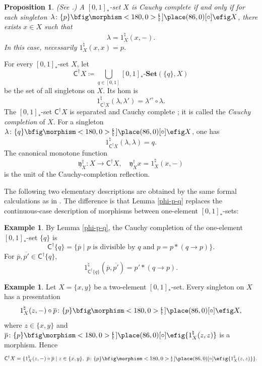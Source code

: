 \documentclass{birkau}
\theoremstyle{plain}
\newtheorem{prop}[thm]{Proposition}
\theoremstyle{definition}
\newtheorem{exmp}[thm]{Example}
\def\oto{{\bfig\morphism<180,0>[\mkern-4mu`\mkern-4mu;]\place(86,0)[\circ]\efig}}
\newcommand{\ra}{\rightarrow}
\newcommand{\nat}{\natural}
\newcommand{\lam}{\lambda}
\newcommand{\sC}{\mathsf{C}}
\newcommand{\Fy}{\mathfrak{y}}
\newcommand{\Set}{\mathbf{Set}}
\newcommand{\RSet}{[0,1]_*\text{-}\Set}
\newcommand{\sCd}{\sC^{\dag}}
\newcommand{\Fyd}{\Fy^{\dag}}
\newcommand{\CdX}{\sCd X}
\numberwithin{equation}{section}
\begin{document}
\begin{prop} \label{Cauchy-complete-def} (See \cite[Proposition 7.1]{Stubbe2005}.)
A $[0,1]_*$-set $X$ is Cauchy complete if and only if for each singleton $\lam\colon\{p\}\oto X$, there exists $x\in X$ such that
\[\lam=1_X^{\nat}(x,-).\]
In this case, necessarily $1_X^{\nat}(x,x)=p$.
\end{prop}

For every $[0,1]_*$-set $X$, let
\[\CdX\coloneqq\bigcup_{q\in[0,1]}\RSet(\{q\},X)\]
be the set of all singletons on $X$. Its hom is
\begin{equation} \label{CdX-hom}
1_{\CdX}^{\nat}(\lam,\lam')={\lam'}^{\circ}\circ\lam.
\end{equation}
The $[0,1]_*$-set $\CdX$ is separated and Cauchy complete \cite[Proposition 7.12]{Stubbe2005}; it is called the \emph{Cauchy completion} of $X$. For a singleton $\lam\colon\{q\}\oto X$, one has
\begin{equation} \label{CdX-type}
1_{\CdX}^{\nat}(\lam,\lam)=q.
\end{equation}
The canonical monotone function
\begin{equation} \label{FYd-def}
\Fyd_X\colon X\to\CdX,\quad \Fyd_X x=1_X^{\nat}(x,-)
\end{equation}
is the unit of the Cauchy-completion reflection.

The following two elementary descriptions are obtained by the same formal calculations as in \cite[Examples 3.3 and 3.4]{Shen2026}. The difference is that Lemma \ref{phi-p-q} replaces the continuous-case description of morphisms between one-element $[0,1]_*$-sets:

\begin{exmp} \label{Cdq-exmp}
By Lemma \ref{phi-p-q}, the Cauchy completion of the one-element $[0,1]_*$-set $\{q\}$ is
\begin{equation} \label{Cdq}
\sCd\{q\}=\{\overline{p}\mid p\text{ is divisible by }q\text{ and }p=p*(q\ra p)\}.
\end{equation}
For $\overline{p},\overline{p'}\in\sCd\{q\}$,
\begin{equation} \label{Cdp-hom}
1_{\sCd\{q\}}^{\nat}(\overline{p},\overline{p'})=p'*(q\ra p).
\end{equation}
\end{exmp}

\begin{exmp} \label{Cdq-x-y-exmp}
Let $X=\{x,y\}$ be a two-element $[0,1]_*$-set. Every singleton on $X$ has a presentation
\[
1_X^{\nat}(z,-)\circ\overline{p}\colon\{p\}\oto X,
\]
where $z\in\{x,y\}$ and $\overline{p}\colon\{p\}\oto\{1_X^{\nat}(z,z)\}$ is a morphism. Hence
\[
\sCd X=\{1_X^{\nat}(z,-)\circ\overline{p}\mid z\in\{x,y\},\ \overline{p}\colon\{p\}\oto\{1_X^{\nat}(z,z)\}\}.
\]
\end{exmp}
\end{document}
